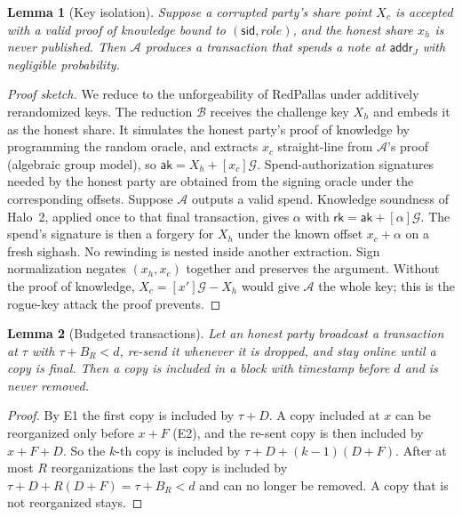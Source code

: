 \documentclass[10pt,letterpaper]{article}
\makeatletter
\renewcommand\section{\@startsection{section}{1}{\z@}{-1.3em}{0.45em}{\normalfont\large\bfseries}}
\theoremstyle{plain}
\newtheorem{lemma}{Lemma}
\theoremstyle{definition}
\newcommand{\ak}{\mathsf{ak}}
\newcommand{\rk}{\mathsf{rk}}
\newcommand{\Gor}{\mathcal{G}}
\makeatother
\begin{document}
\section{Security Analysis}

\begin{lemma}[Key isolation]
Suppose a corrupted party's share point $X_c$ is accepted with a valid proof of knowledge bound to
$(\mathsf{sid}, \mathit{role})$, and the honest share $x_h$ is never published. Then $\mathcal{A}$
produces a transaction that spends a note at $\mathsf{addr}_J$ with negligible probability.
\end{lemma}
\begin{proof}[Proof sketch]
We reduce to the unforgeability of RedPallas under additively rerandomized keys. The reduction
$\mathcal{B}$ receives the challenge key $X_h$ and embeds it as the honest share. It simulates the
honest party's proof of knowledge by programming the random oracle, and extracts $x_c$
straight-line from $\mathcal{A}$'s proof (algebraic group model), so $\ak = X_h + [x_c]\Gor$.
Spend-authorization signatures needed by the honest party are obtained from the signing oracle
under the corresponding offsets. Suppose $\mathcal{A}$ outputs a valid spend. Knowledge soundness of
Halo~2, applied once to that final transaction, gives $\alpha$ with $\rk = \ak + [\alpha]\Gor$.
The spend's signature is then a forgery for $X_h$ under the known offset $x_c + \alpha$ on a fresh
sighash. No rewinding is nested inside another extraction. Sign normalization negates
$(x_h, x_c)$ together and preserves the argument. Without the proof of knowledge,
$X_c = [x']\Gor - X_h$ would give $\mathcal{A}$ the whole key; this is the rogue-key attack the
proof prevents.
\end{proof}

\begin{lemma}[Budgeted transactions]
Let an honest party broadcast a transaction at $\tau$ with $\tau + B_R < d$, re-send it whenever
it is dropped, and stay online until a copy is final. Then a copy is included in a block with
timestamp before $d$ and is never removed.
\end{lemma}
\begin{proof}
By E1 the first copy is included by $\tau + D$. A copy included at $x$ can be reorganized only
before $x + F$ (E2), and the re-sent copy is then included by $x + F + D$. So the $k$-th copy is
included by $\tau + D + (k-1)(D+F)$. After at most $R$ reorganizations the last copy is included
by $\tau + D + R(D+F) = \tau + B_R < d$ and can no longer be removed. A copy that is not
reorganized stays.
\end{proof}
\end{document}
